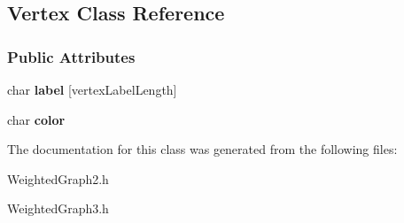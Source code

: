 \hypertarget{class_vertex}{}\subsection{Vertex Class Reference}
\label{class_vertex}
\subsubsection*{Public Attributes}
\begin{DoxyCompactItemize}
\item 
char {\bfseries label} \mbox{[}vertex\+Label\+Length\mbox{]}\hypertarget{class_vertex_a13fe33790b41909253d58bb546c4402f}{}\label{class_vertex_a13fe33790b41909253d58bb546c4402f}

\item 
char {\bfseries color}\hypertarget{class_vertex_ab9455c96462d157dd94b7c1e7cdff135}{}\label{class_vertex_ab9455c96462d157dd94b7c1e7cdff135}

\end{DoxyCompactItemize}


The documentation for this class was generated from the following files\+:\begin{DoxyCompactItemize}
\item 
Weighted\+Graph2.\+h\item 
Weighted\+Graph3.\+h\end{DoxyCompactItemize}
